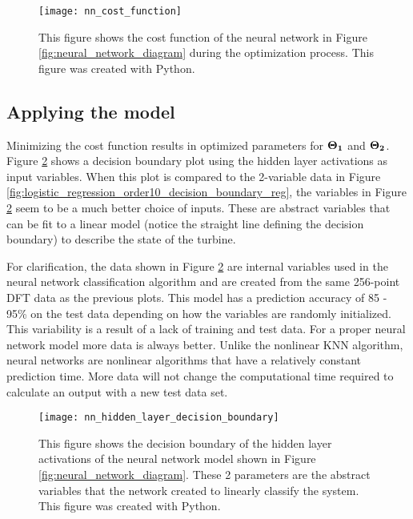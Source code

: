 \begin{figure}
\centering
\texttt{[image: nn\_cost\_function]}
\decoRule
\caption{This figure shows the cost function of the neural network in Figure \ref{fig:neural_network_diagram} during the optimization process. This figure was created with Python.}
\label{fig:nn_cost_function}
\end{figure}

\subsection{Applying the model}
Minimizing the cost function results in optimized parameters for $\mathbf{\Theta_1}$ and $\mathbf{\Theta_2}$.  Figure \ref{fig:nn_hidden_layer_decision_boundary} shows a decision boundary plot using the hidden layer activations as input variables.  When this plot is compared to the 2-variable data in Figure \ref{fig:logistic_regression_order10_decision_boundary_reg}, the variables in Figure \ref{fig:nn_hidden_layer_decision_boundary} seem to be a much better choice of inputs.  These are abstract variables that can be fit to a linear model (notice the straight line defining the decision boundary) to describe the state of the turbine.

For clarification, the data shown in Figure \ref{fig:nn_hidden_layer_decision_boundary} are internal variables used in the neural network classification algorithm and are created from the same 256-point DFT data as the previous plots.  This model has a prediction accuracy of 85 - 95\% on the test data depending on how the variables are randomly initialized.  This variability is a result of a lack of training and test data.  For a proper neural network model more data is always better.  Unlike the nonlinear KNN algorithm, neural networks are nonlinear algorithms that have a relatively constant prediction time.  More data will not change the computational time required to calculate an output with a new test data set.

\begin{figure}
\centering
\texttt{[image: nn\_hidden\_layer\_decision\_boundary]}
\decoRule
\caption{This figure shows the decision boundary of the hidden layer activations of the neural network model shown in Figure \ref{fig:neural_network_diagram}.  These 2 parameters are the abstract variables that the network created to linearly classify the system. This figure was created with Python.}
\label{fig:nn_hidden_layer_decision_boundary}
\end{figure}

